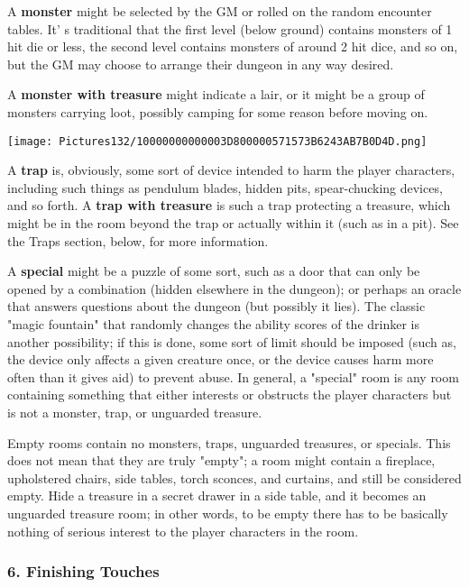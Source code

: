 \documentclass[a4paper,twoside,openany,10pt]{book}
\begin{document}
\begin{multicols}{2}
A \textbf{monster} might be selected by the GM or rolled on the random encounter tables. It' s traditional that the first level (below ground) contains monsters of 1 hit die or less, the second level contains monsters of around 2 hit dice, and so on, but the GM may choose to arrange their dungeon in any way desired.

A \textbf{monster with treasure} might indicate a lair, or it might be a group of monsters carrying loot, possibly camping for some reason before moving on. 

\begin{center}
	\texttt{[image: Pictures132/10000000000003D800000571573B6243AB7B0D4D.png]}  
\end{center}

A \textbf{trap} is, obviously, some sort of device intended to harm the player characters, including such things as pendulum blades, hidden pits, spear-chucking devices, and so forth. A \textbf{trap with treasure} is such a trap protecting a treasure, which might be in the room beyond the trap or actually within it (such as in a pit). See the Traps section, below, for more information.

A \textbf{special} might be a puzzle of some sort, such as a door that can only be opened by a combination (hidden elsewhere in the dungeon); or perhaps an oracle that answers questions about the dungeon (but possibly it lies). The classic "magic fountain" that randomly changes the ability scores of the drinker is another possibility; if this is done, some sort of limit should be imposed (such as, the device only affects a given creature once, or the device causes harm more often than it gives aid) to prevent abuse. In general, a "special" room is any room containing something that either interests or obstructs the player characters but is not a monster, trap, or unguarded treasure.

Empty rooms contain no monsters, traps, unguarded treasures, or specials. This does not mean that they are truly "empty"; a room might contain a fireplace, upholstered chairs, side tables, torch sconces, and curtains, and still be considered empty. Hide a treasure in a secret drawer in a side table, and it becomes an unguarded treasure room; in other words, to be empty there has to be basically nothing of serious interest to the player characters in the room.


\subsubsection{6. Finishing Touches}\label{finishing-touches}


\end{multicols}
\end{document}
